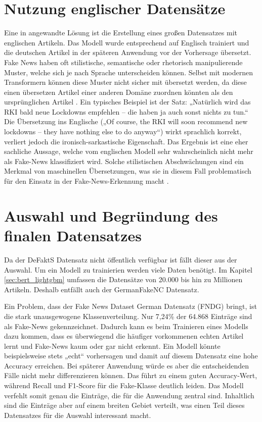 
\section{Nutzung englischer Datensätze}

Eine in \cite{Simone2022} angewandte Lösung ist die Erstellung eines großen Datensatzes mit englischen Artikeln. Das Modell wurde entsprechend auf Englisch 
trainiert und die deutschen Artikel in der späteren Anwendung vor der Vorhersage übersetzt.
Fake News haben oft stilistische, semantische oder rhetorisch manipulierende Muster, welche sich je nach Sprache unterscheiden können.
Selbst mit modernen Transformern können diese Muster nicht sicher mit übersetzt werden, da diese einen übersetzen Artikel einer anderen Domäne zuordnen könnten
als den ursprünglichen Artikel \cite{hong2023disentanglingstructurestylepolitical}. 
Ein typisches Beispiel ist der Satz: „Natürlich wird das RKI bald neue Lockdowns empfehlen – die haben ja auch sonst nichts zu tun.“ 
Die Übersetzung ins Englische („Of course, the RKI will soon recommend new lockdowns – they have nothing else to do anyway“) wirkt sprachlich korrekt, 
verliert jedoch die ironisch-sarkastische Eigenschaft.
Das Ergebnis ist eine eher sachliche Aussage, welche vom englischen Modell sehr wahrscheinlich nicht mehr als Fake-News klassifiziert wird.
Solche stilistischen Abschwächungen sind ein Merkmal von maschinellen Übersetzungen, was sie in diesem Fall problematisch
für den Einsatz in der Fake-News-Erkennung macht \cite{kuehn2024enhancingrhetoricalfigureannotation}. %

\section{Auswahl und Begründung des finalen Datensatzes}
\label{sec:auswahl_und_begruendung_finaler_datensatz}

Da der DeFaktS Datensatz nicht öffentlich verfügbar ist fällt dieser aus der Auswahl. 
Um ein Modell zu trainierien werden viele Daten benötigt. Im Kapitel \ref{sec:bert_lightgbm} umfassen die Datensätze von 20.000 bis hin zu Millionen Artikeln.
Deshalb entfällt auch der GermanFakeNC Datensatz.

Ein Problem, dass der Fake News Dataset German Datensatz (FNDG) bringt, ist die stark unausgewogene Klassenverteilung. Nur 7,24\% der 64.868 Einträge sind 
als Fake-News gekennzeichnet. Dadurch kann es beim Trainieren eines Modells dazu kommen, dass es überwiegend die häufiger vorkommenen echten Artikel 
lernt und Fake-News kaum oder gar nicht erkennt. 
Ein Modell könnte beispielsweise stets „echt“ vorhersagen und damit auf diesem Datensatz eine hohe Accuracy erreichen.
Bei späterer Anwendung würde es aber die entscheidenden Fälle nicht mehr differenzieren können. 
Das führt zu einem guten Accuracy-Wert, während Recall und F1-Score für die Fake-Klasse deutlich leiden. 
Das Modell verfehlt somit genau die Einträge, die für die Anwendung zentral sind.
Inhaltlich sind die Einträge aber auf einem breiten Gebiet verteilt, was einen Teil dieses Datensatzes für die Auswahl interessant macht.

